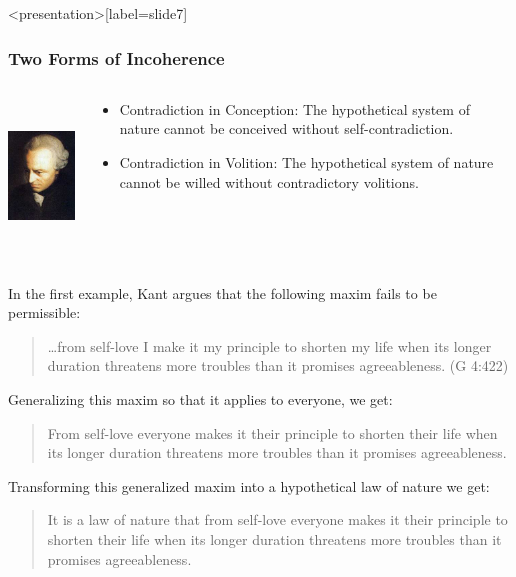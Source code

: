 \begin{frame}<presentation>[label=slide7]
    \frametitle{Two Forms of Incoherence}
        \begin{columns}
            \begin{column}{3cm}
                \includegraphics[height=4cm]{../../graphics/kant.jpg}
            \end{column}
            \begin{column}{7cm}
                \begin{itemize}
                    \item \alert{Contradiction in Conception}: The hypothetical system of nature cannot be conceived without self-contradiction.
                    \item \alert{Contradiction in Volition}: The hypothetical system of nature cannot be willed without contradictory volitions.
                \end{itemize}
            \end{column}
        \end{columns}
\end{frame}

In the first example, Kant argues that the following maxim fails to be permissible:

\begin{quote}
	\ldots from self-love I make it my principle to shorten my life when its longer duration threatens more troubles than it promises agreeableness. (G 4:422)
\end{quote}

Generalizing this maxim so that it applies to everyone, we get:

\begin{quote}
	From self-love everyone makes it their principle to shorten their life when its longer duration threatens more troubles than it promises agreeableness.
\end{quote}

Transforming this generalized maxim into a hypothetical law of nature we get:

\begin{quote}
	It is a law of nature that from self-love everyone makes it their principle to shorten their life when its longer duration threatens more troubles than it promises agreeableness.
\end{quote}

